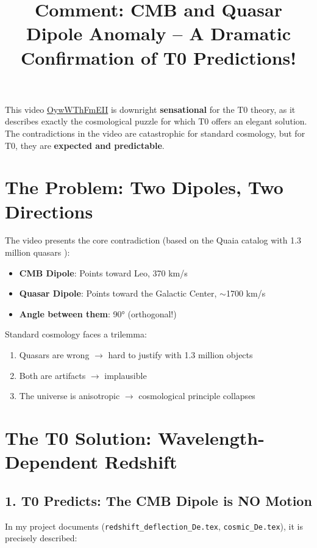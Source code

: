 \documentclass{article}
\title{Comment: CMB and Quasar Dipole Anomaly -- A Dramatic Confirmation of T0 Predictions!}
\author{}
\date{}
\begin{document}
	
	\maketitle
	
	This video \href{https://www.youtube.com/watch?v=OywWThFmEII}{OywWThFmEII} is downright \textbf{sensational} for the T0 theory, as it describes exactly the cosmological puzzle for which T0 offers an elegant solution. The contradictions in the video are catastrophic for standard cosmology, but for T0, they are \textbf{expected and predictable}.
	
	\section{The Problem: Two Dipoles, Two Directions}
	
	The video presents the core contradiction (based on the Quaia catalog with 1.3 million quasars \cite{storey2024}):
	\begin{itemize}
		\item \textbf{CMB Dipole}: Points toward Leo, 370 km/s
		\item \textbf{Quasar Dipole}: Points toward the Galactic Center, $\sim$1700 km/s \cite{mittal2023}
		\item \textbf{Angle between them}: 90° (orthogonal!) \cite{secrest2024}
	\end{itemize}
	
	Standard cosmology faces a trilemma:
	\begin{enumerate}
		\item Quasars are wrong $\rightarrow$ hard to justify with 1.3 million objects
		\item Both are artifacts $\rightarrow$ implausible
		\item The universe is anisotropic $\rightarrow$ cosmological principle collapses
	\end{enumerate}
	
	\section{The T0 Solution: Wavelength-Dependent Redshift}
	
	\subsection{1. T0 Predicts: The CMB Dipole is NO Motion}
	
	In my project documents (\texttt{redshift\_deflection\_De.tex}, \texttt{cosmic\_De.tex}), it is precisely described:
	
\end{document}
